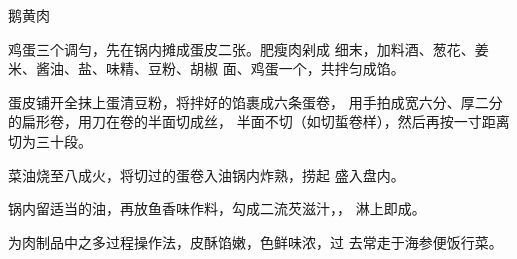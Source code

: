 \begin{recipe}{鹅黄肉}

\ingredients


\cooking

\step 鸡蛋三个调勻，先在锅内摊成蛋皮二张。肥瘦肉剁成 细末，加料酒、葱花、姜米、酱油、盐、味精、豆粉、胡椒 面、鸡蛋一个，共拌匀成馅。

\step 蛋皮铺开全抹上蛋清豆粉，将拌好的馅裹成六条蛋卷， 用手拍成宽六分、厚二分的扁形卷，用刀在卷的半面切成丝， 半面不切（如切蜇卷样），然后再按一寸距离切为三十段。

\step 菜油烧至八成火，将切过的蛋卷入油锅内炸熟，捞起 盛入盘内。

\step 锅内留适当的油，再放鱼香味作料，勾成二流芡滋汁，， 淋上即成。

\notes

为肉制品中之多过程操作法，皮酥馅嫩，色鲜味浓，过 去常走于海参便饭行菜。

\end{recipe}

